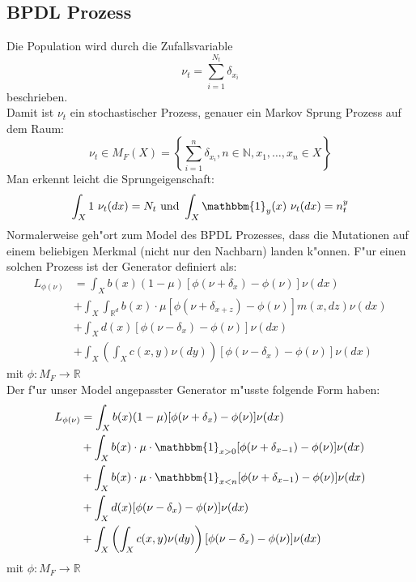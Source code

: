 \documentclass[11pt, a4paper, german]{article}
\begin{document}
	\subsection{BPDL Prozess}
	Die Population wird durch die Zufallsvariable
	\[ \nu_t = \sum_{i=1}^{N_t} \delta_{x_i} \]
	beschrieben. \\
	Damit ist $ \nu_t $	ein stochastischer Prozess, genauer ein Markov Sprung Prozess auf dem Raum:
	\[ \nu_t \in M_F(X) = \left\{ \sum_{i=1}^{n} \delta_{x_i}, n \in \mathbb{N}, x_1, \dots, x_n \in X \right\} \]
	Man erkennt leicht die Sprungeigenschaft:
	\[ \int_X 1 \text{ } \nu_t(dx) = N_t 
	\text{ und }
	\int_X \mathbbm{1}_y(x) \text{ } \nu_t(dx) = n_t^{y} \]
	Normalerweise geh"ort zum Model des BPDL Prozesses, dass die Mutationen auf einem beliebigen Merkmal (nicht nur den Nachbarn) landen k"onnen. F"ur einen solchen Prozess ist der Generator definiert als:
	\begin{align*}
		L_{\phi(\nu)} &= \int_{X} b(x)(1-\mu)[\phi(\nu + \delta_x) - \phi(\nu)]\nu(dx)\\
					  &+ \int_{X}\int_{\mathbb{R}^d} b(x) \cdot \mu [\phi(\nu + \delta_{x+z}) - \phi(\nu)] m(x,dz) \nu(dx)\\
				  	  &+ \int_{X} d(x)[\phi(\nu - \delta_x) - \phi(\nu)]\nu(dx)\\
				 	  &+ \int_{X} \left( \int_{X} c(x,y) \nu(dy) \right) [\phi(\nu - \delta_x) - \phi(\nu)]\nu(dx)
	\end{align*}
	mit $ \phi: M_F \to \mathbb{R} $\\
	Der f"ur unser Model angepasster Generator m"usste folgende Form haben:
	\begin{align*}
		L_{\phi(\nu)} &= \int_{X} b(x)(1-\mu)[\phi(\nu + \delta_x) - \phi(\nu)]\nu(dx)\\
					  &+ \int_{X} b(x) \cdot \mu \cdot \mathbbm{1}_{x > 0} 
					  [\phi(\nu + \delta_{x-1}) - \phi(\nu)]  \nu(dx)\\
					  &+ \int_{X} b(x) \cdot \mu \cdot \mathbbm{1}_{x < n} 
					  [\phi(\nu + \delta_{x-1}) - \phi(\nu)]  \nu(dx)\\
					  &+ \int_{X} d(x)[\phi(\nu - \delta_x) - \phi(\nu)]\nu(dx)\\
					  &+ \int_{X} \left( \int_{X} c(x,y) \nu(dy) \right) [\phi(\nu - \delta_x) - \phi(\nu)]\nu(dx)
	\end{align*}
	mit $ \phi: M_F \to \mathbb{R} $\\	

		
		
	
	
\end{document}
